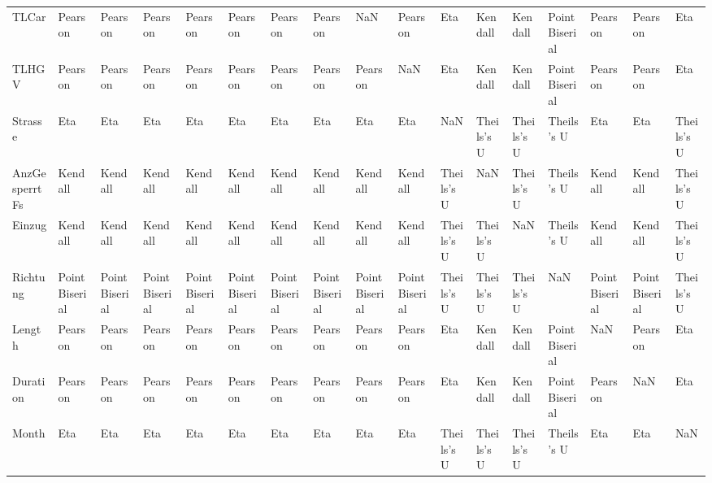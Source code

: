 \begin{tabular}{lllllllllllllllll}
TLCar         &         Pearson &         Pearson &         Pearson &         Pearson &         Pearson &         Pearson &         Pearson &             NaN &         Pearson &         Eta &       Kendall &     Kendall &  Point Biserial &         Pearson &         Pearson &         Eta \\
TLHGV         &         Pearson &         Pearson &         Pearson &         Pearson &         Pearson &         Pearson &         Pearson &         Pearson &             NaN &         Eta &       Kendall &     Kendall &  Point Biserial &         Pearson &         Pearson &         Eta \\
Strasse       &             Eta &             Eta &             Eta &             Eta &             Eta &             Eta &             Eta &             Eta &             Eta &         NaN &    Theils's U &  Theils's U &      Theils's U &             Eta &             Eta &  Theils's U \\
AnzGesperrtFs &         Kendall &         Kendall &         Kendall &         Kendall &         Kendall &         Kendall &         Kendall &         Kendall &         Kendall &  Theils's U &           NaN &  Theils's U &      Theils's U &         Kendall &         Kendall &  Theils's U \\
Einzug        &         Kendall &         Kendall &         Kendall &         Kendall &         Kendall &         Kendall &         Kendall &         Kendall &         Kendall &  Theils's U &    Theils's U &         NaN &      Theils's U &         Kendall &         Kendall &  Theils's U \\
Richtung      &  Point Biserial &  Point Biserial &  Point Biserial &  Point Biserial &  Point Biserial &  Point Biserial &  Point Biserial &  Point Biserial &  Point Biserial &  Theils's U &    Theils's U &  Theils's U &             NaN &  Point Biserial &  Point Biserial &  Theils's U \\
Length        &         Pearson &         Pearson &         Pearson &         Pearson &         Pearson &         Pearson &         Pearson &         Pearson &         Pearson &         Eta &       Kendall &     Kendall &  Point Biserial &             NaN &         Pearson &         Eta \\
Duration      &         Pearson &         Pearson &         Pearson &         Pearson &         Pearson &         Pearson &         Pearson &         Pearson &         Pearson &         Eta &       Kendall &     Kendall &  Point Biserial &         Pearson &             NaN &         Eta \\
Month         &             Eta &             Eta &             Eta &             Eta &             Eta &             Eta &             Eta &             Eta &             Eta &  Theils's U &    Theils's U &  Theils's U &      Theils's U &             Eta &             Eta &         NaN \\
\bottomrule
\end{tabular}
